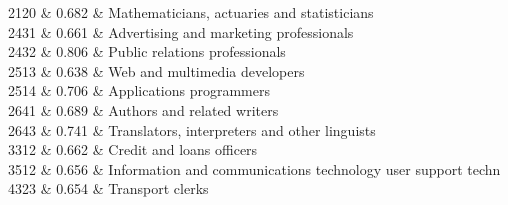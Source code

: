 2120 & 0.682 & Mathematicians, actuaries and statisticians \\

2431 & 0.661 & Advertising and marketing professionals \\

2432 & 0.806 & Public relations professionals \\

2513 & 0.638 & Web and multimedia developers \\

2514 & 0.706 & Applications programmers \\

2641 & 0.689 & Authors and related writers \\

2643 & 0.741 & Translators, interpreters and other linguists \\

3312 & 0.662 & Credit and loans officers \\

3512 & 0.656 & Information and communications technology user support techn \\

4323 & 0.654 & Transport clerks \\

